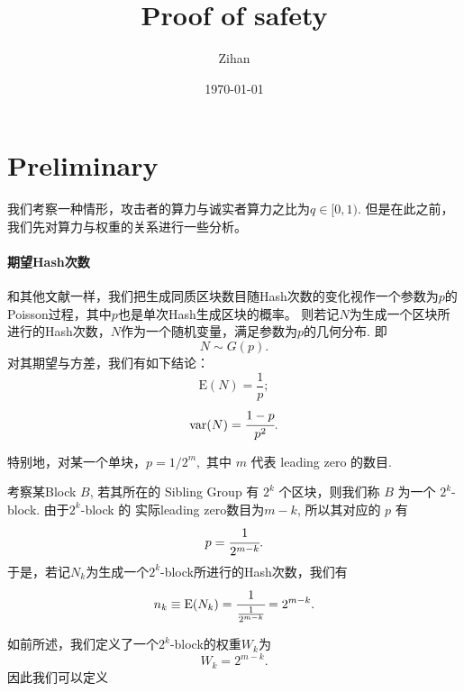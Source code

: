 \documentclass[UTF8]{ctexart}
\title{Proof of safety}
\author{Zihan}
\date{\today}
\newtheorem{Theorem Femat}{Lemma}
\begin{document}
\maketitle

\section{Preliminary}
我们考察一种情形，攻击者的算力与诚实者算力之比为$q \in [0,1)$. 但是在此之前，我们先对算力与权重的关系进行一些分析。

\paragraph{期望Hash次数}

和其他文献一样，我们把生成同质区块数目随Hash次数的变化视作一个参数为$p$的Poisson过程，其中$p$也是单次Hash生成区块的概率。
则若记$N$为生成一个区块所进行的Hash次数，$N$作为一个随机变量，满足参数为$p$的几何分布. 即
\[N \sim G(p).\]
对其期望与方差，我们有如下结论：
\[\text{E}(N)=\frac{1}{p};\]
\[\text{var}(N) = \cfrac{1-p}{p^2}.\]

特别地，对某一个单块，$p = 1/2^m,$ 其中 $m$ 代表 leading zero 的数目.

考察某Block $B$, 若其所在的 Sibling Group 有 $2^k$ 个区块，则我们称 $B$ 为一个 $2^k$-block. 由于$2^k$-block 的
实际leading zero数目为$m-k$, 所以其对应的 $p$ 有
\[p = \cfrac{1}{2^{m-k}}.\]
于是，若记$N_k$为生成一个$2^k$-block所进行的Hash次数，我们有
$$n_k\equiv\text{E}(N_k)=\cfrac{1}{\frac{1}{2^{m-k}}}=2^{m-k}.$$

如前所述，我们定义了一个$2^k$-block的权重$W_k$为
\[W_k=2^{m-k}.\]
因此我们可以定义
\end{document}
